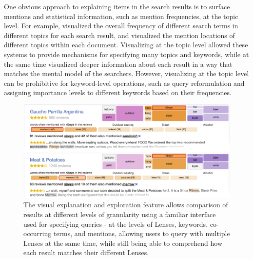 One obvious approach to explaining items in the search results is to surface mentions and statistical information, such as mention frequencies, at the topic level. For example, \cite{hoeber2006comparative} visualized the overall frequency of different search terms in different topics for each search result, and \cite{hearst1996visualizing} visualized the mention locations of different topics within each document. Visualizing at the topic level allowed these systems to provide mechanisms for specifying many topics and keywords, while at the same time visualized deeper information about each result in a way that matches the mental model of the searchers. However, visualizing at the topic level can be prohibitive for keyword-level operations, such as query reformulation and assigning importance levels to different keywords based on their frequencies.

\begin{figure}
    \centering
    \includegraphics[width=0.8\columnwidth]{Chapters/SearchLens/figures/compare2.png}
    \caption[The visual explanation and exploration feature of SearchLens.]{The visual explanation and exploration feature allows comparison of results at different levels of granularity using a familiar interface used for specifying queries - at the levels of Lenses, keywords, co-occurring terms, and mentions, allowing users to query with multiple Lenses at the same time, while still being able to comprehend how each result matches their different Lenses.}
    \label{fig:sl_compare}
\end{figure}


